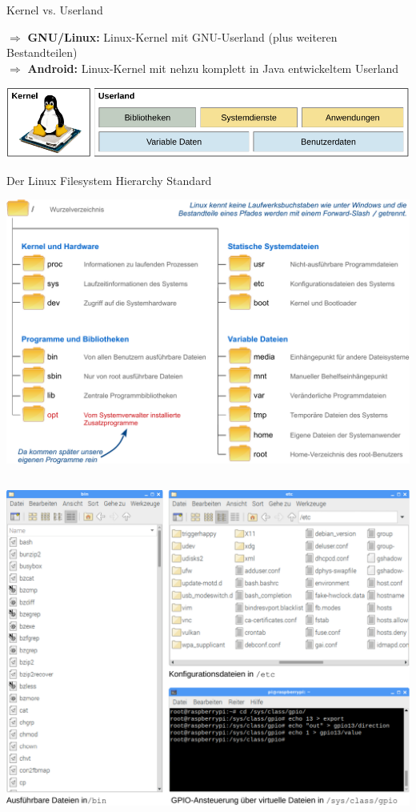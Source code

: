 {\begin{frame}{Kernel vs. Userland}
    \vfill

    $\Rightarrow$ \textbf{GNU/Linux:} Linux-Kernel mit GNU-Userland (plus weiteren Bestandteilen) \\
    $\Rightarrow$ \textbf{Android:} Linux-Kernel mit nehzu komplett in Java entwickeltem Userland
    \medskip

    \includegraphics[width=\textwidth]{8-linux/img/linux-bestandteile}
\end{frame}
}

{
\footnotesize

\begin{frame}[allowframebreaks]{Der Linux Filesystem Hierarchy Standard}
    \begin{center}
        \includegraphics[width=\textwidth]{8-linux/img/fhs-verzeichnisse}
    \end{center}

    \framebreak

    \begin{columns}[T]
        \includegraphics[width=\textwidth]{8-linux/img/fhs-beispiele}


\end{columns}
\end{frame}}
